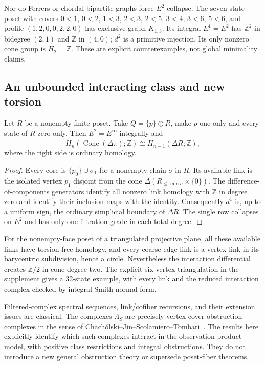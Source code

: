 Nor do Ferrers or chordal-bipartite graphs force $E^2$ collapse.
The seven-state poset with covers
$0<1$, $0<2$, $1<3$, $2<3$, $2<5$, $3<4$, $3<6$, $5<6$,
and profile $(1,2,0,0,2,2,0)$ has exclusive graph $K_{1,3}$.
Its integral $E^1=E^2$ has $\mathbb Z^2$ in bidegree $(2,1)$
and $\mathbb Z$ in $(4,0)$; $d^2$ is a primitive injection.
Its only nonzero cone group is $H_2=\mathbb Z$.
These are explicit counterexamples, not global minimality claims.

\subsection{An unbounded interacting class and new torsion}
\begin{proposition}
Let $R$ be a nonempty finite poset.  Take $Q=\{p\}\oplus R$, make
$p$ one-only and every state of $R$ zero-only.  Then $E^2=E^\infty$
integrally and
\[
 \widetilde H_n(\operatorname{Cone}(\Delta\pi);\mathbb Z)
 \cong H_{n-1}(\Delta R;\mathbb Z),
\]
where the right side is ordinary homology.
\end{proposition}
\begin{proof}
Every core is $\{p_0\}\cup\sigma_1$ for a nonempty chain $\sigma$
in $R$.  Its available link is the isolated vertex $p_1$ disjoint from
the cone $\Delta(R_{\le\min\sigma}\times\{0\})$.
The difference-of-components generators identify all nonzero link
homology with $\mathbb Z$ in degree zero and identify their inclusion
maps with the identity.  Consequently $d^1$ is, up to a uniform sign,
the ordinary simplicial boundary of $\Delta R$.  The single row
collapses on $E^2$ and has only one filtration grade in each total degree.
\end{proof}

For the nonempty-face poset of a triangulated projective plane, all these
available links have torsion-free homology, and every coarse edge link
is a vertex link in its barycentric subdivision, hence a circle.
Nevertheless the interaction differential creates $\mathbb Z/2$ in
cone degree two.  The explicit six-vertex triangulation in the
supplement gives a 32-state example, with every link and the reduced
interaction complex checked by integral Smith normal form.

\begin{remark}
Filtered-complex spectral sequences, link/cofiber recursions, and their
extension issues are classical.  The complexes $\Lambda_S$ are precisely
vertex-cover obstruction complexes in the sense of
Chach\'olski--Jin--Scolamiero--Tombari~\cite{ChacholskiEtAl2021}.
The results here explicitly identify which such complexes interact in
the observation product model, with positive class restrictions and
integral obstructions.  They do not introduce a new general obstruction
theory or supersede poset-fiber theorems.
\end{remark}
